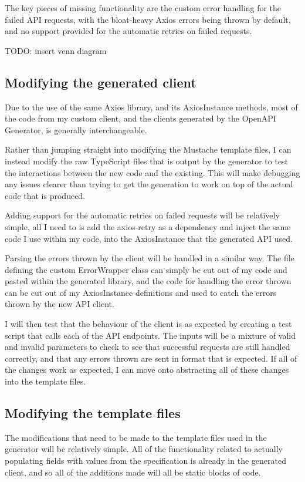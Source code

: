 The key pieces of missing functionality are the custom error handling for the failed API requests, with the bloat-heavy Axios errors being thrown by default, and no support provided for the automatic retries on failed requests.

TODO: insert venn diagram

\subsection{Modifying the generated client}
Due to the use of the same Axios library, and its AxiosInstance methods, most of the code from my custom client, and the clients generated by the OpenAPI Generator, is generally interchangeable.

Rather than jumping straight into modifying the Mustache template files, I can instead modify the raw TypeScript files that is output by the generator to test the interactions between the new code and the existing. This will make debugging any issues clearer than trying to get the generation to work on top of the actual code that is produced.

Adding support for the automatic retries on failed requests will be relatively simple, all I need to is add the axios-retry as a dependency and inject the same code I use within my code, into the AxiosInstance that the generated API used.

Parsing the errors thrown by the client will be handled in a similar way. The file defining the custom ErrorWrapper class can simply be cut out of my code and pasted within the generated library, and the code for handling the error thrown can be cut out of my AxiosInstance definitions and used to catch the errors thrown by the new API client.

I will then test that the behaviour of the client is as expected by creating a test script that calls each of the API endpoints. The inputs will be a mixture of valid and invalid parameters to check to see that successful requests are still handled correctly, and that any errors thrown are sent in format that is expected. If all of the changes work as expected, I can move onto abstracting all of these changes into the template files.
\subsection{Modifying the template files}
The modifications that need to be made to the template files used in the generator will be relatively simple. All of the functionality related to actually populating fields with values from the specification is already in the generated client, and so all of the additions made will all be static blocks of code.

